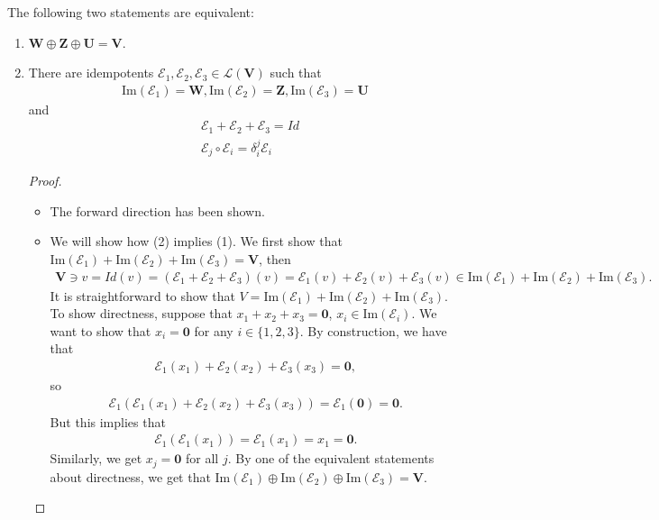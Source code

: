 \documentclass{article}
\theoremstyle{definition}
\newcommand{\V}{\mathbf{V}}
\newcommand{\W}{\mathbf{W}}
\newcommand{\Z}{\mathbf{Z}}
\newcommand{\U}{\mathbf{U}}
\newcommand{\lag}{\mathcal{L}}
\newcommand{\E}{\mathcal{E}}
\newcommand{\ima}{\text{Im}}
\begin{document}
The following two statements are equivalent:
\begin{enumerate}
	\item $\W \oplus \Z \oplus \U = \V$.
	
	\item There are idempotents $\E_1, \E_2, \E_3 \in \lag(\V)$ such that 
	\begin{align*}
	\ima(\E_1) = \W, \ima(\E_2) = \Z, \ima(\E_3) = \U
	\end{align*} 
	and
	\begin{align*}
	&\E_1 + \E_2 + \E_3 = Id\\
	&\E_j \circ \E_i = \delta^j_i \E_i
	\end{align*}
	
	\begin{proof}
		\begin{itemize}
			\item The forward direction has been shown.
			
			\item We will show how (2) implies (1). We first show that $\ima(\E_1) + \ima(\E_2) + \ima(\E_3) = \V$, then
			\begin{align*}
			\V \ni v = Id(v) = (\E_1 + \E_2 + \E_3)(v) = \E_1(v) + \E_2(v) + \E_3(v) \in \ima(\E_1) + \ima(\E_2) + \ima(\E_3).
			\end{align*}
			It is straightforward to show that $V = \ima(\E_1) + \ima(\E_2) + \ima(\E_3)$. To show directness, suppose that $x_1 + x_2 + x_3 = \mathbf{0}$, $x_i \in \ima(\E_i)$. We want to show that $x_i = \mathbf{0}$ for any $i \in \{1,2,3\}$. By construction, we have that
			\begin{align*}
			\E_1(x_1) + \E_2(x_2) + \E_3(x_3) = \mathbf{0},
			\end{align*}
			so
			\begin{align*}
			\E_1\left( \E_1(x_1) + \E_2(x_2) + \E_3(x_3) \right) = \E_1(\mathbf{0}) = \mathbf{0}.
			\end{align*}
			But this implies that 
			\begin{align*}
			\E_1(\E_1(x_1)) = \E_1(x_1) = x_1 = \mathbf{0}.
			\end{align*}
			Similarly, we get $x_j = \mathbf{0}$ for all $j$. By one of the equivalent statements about directness, we get that $\ima(\E_1) \oplus \ima(\E_2) \oplus \ima(\E_3) = \V$. 
		\end{itemize}
	\end{proof}
\end{enumerate}
\end{document}
